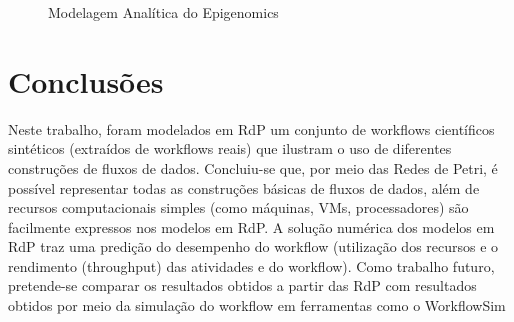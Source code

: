 \documentclass[a4paper,10pt]{article}
\begin{document}
\begin{figure}[!h]
	\centering
	\quad %
	\caption{Modelagem Analítica do Epigenomics}
	\label{modelagem_analitica}
\end{figure}
\newpage

\section*{Conclusões}

Neste trabalho, foram modelados em RdP um conjunto de workflows científicos sintéticos (extraídos de workflows reais) que ilustram o uso de diferentes construções de fluxos de dados. Concluiu-se que, por meio das Redes de Petri, é possível representar todas as construções básicas de fluxos de dados, além de recursos computacionais simples (como máquinas, VMs, processadores) são facilmente expressos nos modelos em RdP. A solução numérica dos modelos em RdP traz uma predição do desempenho do workflow (utilização dos recursos e o rendimento (throughput) das atividades e do workflow). Como trabalho futuro, pretende-se comparar os resultados obtidos a partir das RdP com resultados obtidos por meio da simulação do workflow em ferramentas como o WorkflowSim %



\end{document}
